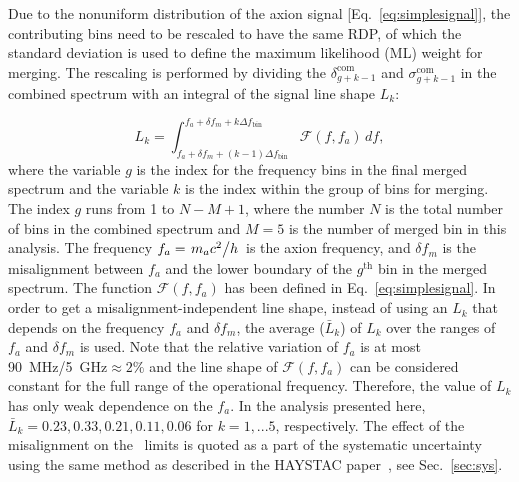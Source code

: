 Due to the nonuniform distribution of the axion signal 
[Eq.~\eqref{eq:simplesignal}],
the contributing bins need to be rescaled to have the same RDP, of which the 
standard deviation is used to define the maximum likelihood (ML)
weight for merging. The rescaling is performed by dividing the 
$\delta^\text{com}_{g+k-1}$ and $\sigma^\text{com}_{g+k-1}$ in the combined 
spectrum with an integral of the signal line shape $L_{k}$:

\begin{equation}
  \label{eq:Lq_integral}
  L_{k} = \int_{f_a +\delta f_m + (k-1)\Delta f_\text{bin}}^{f_a +\delta f_m + k\Delta f_\text{bin}} \mathcal{F}(f,f_a) \,df,
\end{equation}
where the variable $g$ is the index for the frequency bins in 
the final merged spectrum and the variable 
$k$ is the index within the group of bins for 
merging. The index $g$ runs from 1 to $N-M+1$, where 
the number $N$ is the total number of bins in 
the combined spectrum and $M=5$ is the number of 
merged bin in this analysis. 
The frequency $f_a=\left.m_a c^2\middle/h\right.$ is the axion
frequency, and $\delta f_m$ is the misalignment between $f_a$ and the lower
boundary of the $g^\text{th}$ bin in the merged spectrum.
The function $\mathcal{F}(f,f_a)$ has been defined in 
Eq.~\eqref{eq:simplesignal}.
In order to get a misalignment-independent line shape, instead of using an
$L_{k}$ that depends on the frequency $f_a$ and  $\delta f_m$, the average 
($\bar{L}_{k}$) of $L_{k}$ over the ranges of $f_a$ and $\delta f_m$ is 
used. 
Note that the relative variation of $f_a$ is at most 
90~MHz/5~GHz$\approx2\%$ and the line shape of $\mathcal{F}(f,f_a)$ 
can be considered constant for the full range of the operational 
frequency. Therefore, 
the value of $L_{k}$ has only weak dependence on the $f_a$. 
In the analysis presented here, 
$\bar{L}_{k} = 0.23, 0.33, 0.21, 0.11, 0.06$ for $k = 1, ... 5$, respectively.
The effect of the misalignment on the \gagg\ limits is quoted as a part of 
the systematic uncertainty using the same method as described in the HAYSTAC 
paper~\cite{HAYSTACII}, see Sec.~\ref{sec:sys}.

